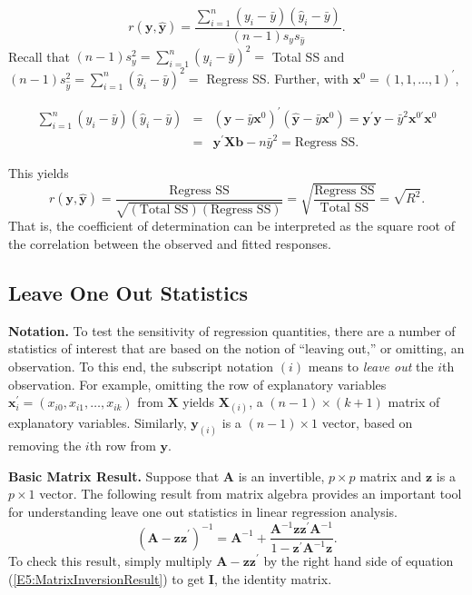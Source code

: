 \begin{equation*}
r(\mathbf{y,\hat{y}})=\frac{\sum_{i=1}^{n}(y_i-\bar{y})(\hat{y}_i-\bar{y}%
)}{(n-1)s_{y}s_{\hat{y}}}.
\end{equation*}
Recall that $(n-1)s_{y}^2=\sum_{i=1}^{n}(y_i-\bar{y})^2=$ Total SS and $%
(n-1)s_{\hat{y}}^2=\sum_{i=1}^{n}(\hat{y}_i-\bar{y})^2=$ Regress SS.
Further, with $\mathbf{x}^{0}=(1,1,\ldots,1)^{\prime}$,
\begin{center}
\begin{eqnarray*}
\sum_{i=1}^{n}(y_i-\bar{y})(\hat{y}_i-\bar{y}) &=&(\mathbf{y}-\bar{y}%
\mathbf{x}^{0})^{\prime}(\mathbf{\hat{y}}-\bar{y}\mathbf{x}^{0})=\mathbf{y}%
^{\prime}\mathbf{\hat{y}}-\bar{y}^2\mathbf{x}^{0\prime }\mathbf{x}^{0} \\
&=&\mathbf{y}^{\prime}\mathbf{Xb}-n\bar{y}^2=\text{Regress SS.}
\end{eqnarray*}
\end{center}
This yields
\begin{equation}\label{E5:R2Correlation}
r(\mathbf{y,\hat{y}})=\frac{\text{Regress SS}}{\sqrt{\left(
\text{Total SS} \right) \left( \text{Regress SS}\right)
}}=\sqrt{\frac{\text{Regress SS}}{\text{Total SS}}}=\sqrt{R^2}.
\end{equation}
That is, the coefficient of determination can be interpreted as the
square root of the correlation between the observed and fitted
responses.

\subsection{Leave One Out Statistics}\label{S5:LOOStatistics}

\textbf{Notation.} To test the sensitivity of regression quantities,
there are a number of statistics of interest that are based on the
notion of ``leaving out,'' or omitting, an observation. To this end,
the subscript notation $(i)$ means to \textit{leave out} the $i$th
observation. For example, omitting the row of explanatory variables
$\mathbf{x}_i^{\prime}=(x_{i0},x_{i1},\dots,x_{ik})$ from
$\mathbf{X}$ yields $\mathbf{X}_{(i)}$, a
$(n-1)\times (k+1)$ matrix of explanatory variables. Similarly, $\mathbf{y}%
_{(i)}$ is a $(n-1)\times 1$ vector, based on removing the $i$th row from $%
\mathbf{y}$.

\textbf{Basic Matrix Result.} Suppose that $\mathbf{A}$ is an invertible, $%
p\times p$ matrix and $\mathbf{z}$ is a $p\times 1$ vector. The
following result from matrix algebra provides an important tool for
understanding leave one out statistics in linear regression
analysis.
\begin{equation}\label{E5:MatrixInversionResult}
\left( \mathbf{A-zz}^{\prime}\right) ^{-1}=\mathbf{A}^{-1}+\frac{\mathbf{A}%
^{-1}\mathbf{zz}^{\prime}\mathbf{A}^{-1}}{1-\mathbf{z}^{\prime}\mathbf{A}%
^{-1}\mathbf{z}}.
\end{equation}
To check this result, simply multiply $\mathbf{A-zz}^{\prime}$ by
the right hand side of equation (\ref{E5:MatrixInversionResult}) to
get $\mathbf{I}$, the identity matrix.

